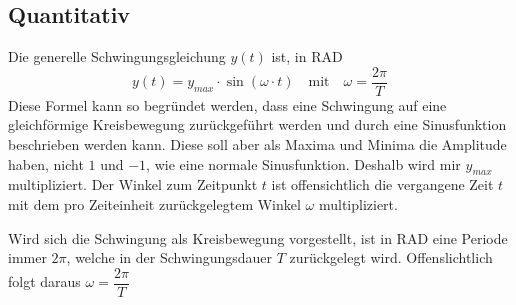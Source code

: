 \documentclass{article}
\begin{document}
\subsection{Quantitativ}
Die generelle Schwingungsgleichung $y(t)$ ist, in RAD
\[
 y(t) = y_{max} \cdot \sin{(\omega \cdot t)} 
 \quad \text{mit} \quad
 \omega = \frac{2\pi}{T} 
\]
Diese Formel kann so begründet werden, dass eine Schwingung auf eine gleichförmige Kreisbewegung zurückgeführt werden und durch eine Sinusfunktion beschrieben werden kann. Diese soll aber als Maxima und Minima die Amplitude haben, nicht $1$ und $-1$, wie eine normale Sinusfunktion. Deshalb wird mir $y_{max}$ multipliziert. Der Winkel zum Zeitpunkt $t$ ist offensichtlich die vergangene Zeit $t$ mit dem pro Zeiteinheit zurückgelegtem Winkel $\omega$ multipliziert.
 
Wird sich die Schwingung als Kreisbewegung vorgestellt, ist in RAD eine Periode immer $2\pi$, welche in der Schwingungsdauer $T$ zurückgelegt wird. Offenslichtlich folgt daraus $\omega = \dfrac{2\pi}{T}$ 
\end{document}
